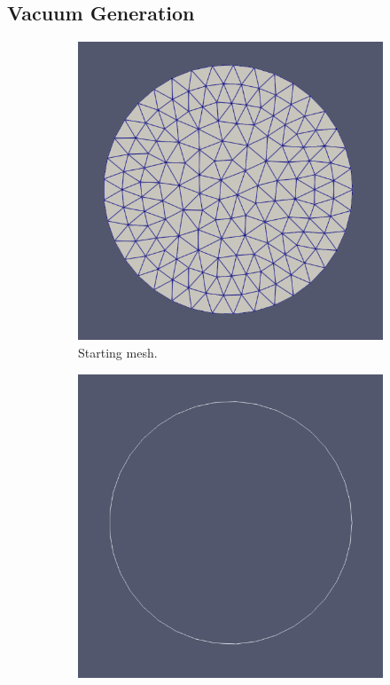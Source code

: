 \documentclass[12pt, letterpaper]{article}
\begin{document}
\subsection{Vacuum Generation}
\begin{figure}
	\begin{subfigure}{0.4\textwidth}
	    \includegraphics[width=\linewidth]{	processExample/circle.png}
	    \caption{Starting mesh.}
	\end{subfigure}
	\hspace*{\fill}	
	\begin{subfigure}{0.4\textwidth}
	    \includegraphics[width=\linewidth]{	processExample/skin.png}

\end{subfigure}
\end{figure}
\end{document}
